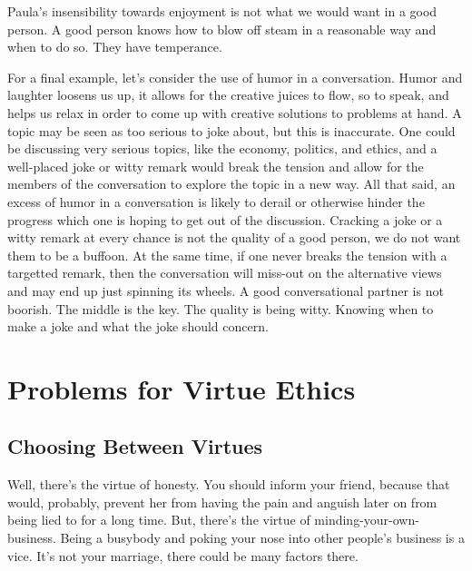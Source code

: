 Paula's insensibility towards enjoyment is not what we would want in a good person. A good person knows how to blow off steam in a reasonable way and when to do so. They have temperance.

For a final example, let's consider the use of humor in a conversation. Humor and laughter loosens us up, it allows for the creative juices to flow, so to speak, and helps us relax in order to come up with creative solutions to problems at hand. A topic may be seen as too serious to joke about, but this is inaccurate. One could be discussing very serious topics, like the economy, politics, and ethics, and a well-placed joke or witty remark would break the tension and allow for the members of the conversation to explore the topic in a new way. All that said, an excess of humor in a conversation is likely to derail or otherwise hinder the progress which one is hoping to get out of the discussion. Cracking a joke or a witty remark at every chance is not the quality of a good person, we do not want them to be a buffoon. At the same time, if one never breaks the tension with a targetted remark, then the conversation will miss-out on the alternative views and may end up just spinning its wheels. A good conversational partner is not boorish. The middle is the key. The quality is being witty. Knowing when to make a joke and what the joke should concern. 

\section{Problems for Virtue Ethics}

\subsection{Choosing Between Virtues}


Well, there’s the virtue of honesty. You should inform your friend, because that would, probably, prevent her from having the pain and anguish later on from being lied to for a long time. But, there’s the virtue of minding-your-own-business. Being a busybody and poking your nose into other people’s business is a vice. It’s not your marriage, there could be many factors there.

